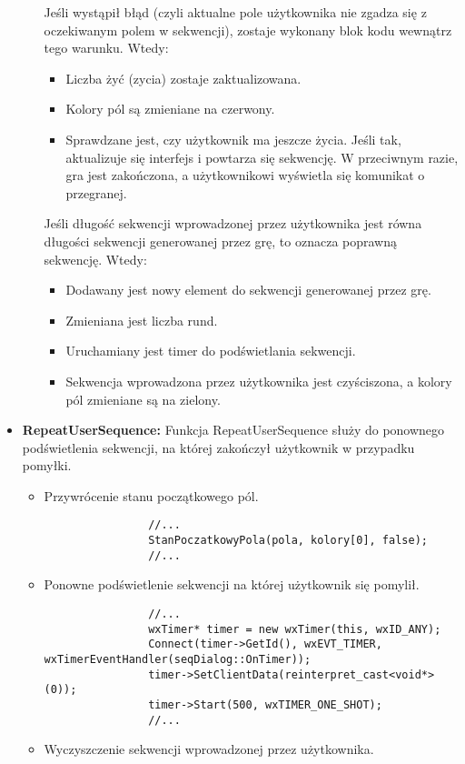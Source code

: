 \documentclass[]{report}
\begin{document}
\begin{itemize}
\begin{itemize}
			Jeśli wystąpił błąd (czyli aktualne pole użytkownika nie zgadza się z oczekiwanym polem w sekwencji), zostaje wykonany blok kodu wewnątrz tego warunku. Wtedy:
			\begin{itemize}
				\item Liczba żyć (zycia) zostaje zaktualizowana.
				\item Kolory pól są zmieniane na czerwony.
				\item Sprawdzane jest, czy użytkownik ma jeszcze życia. Jeśli tak, aktualizuje się interfejs i powtarza się sekwencję. W przeciwnym razie, gra jest zakończona, a użytkownikowi wyświetla się komunikat o przegranej.
			\end{itemize}
			Jeśli długość sekwencji wprowadzonej przez użytkownika jest równa długości sekwencji generowanej przez grę, to oznacza poprawną sekwencję. Wtedy:
			\begin{itemize}
				\item Dodawany jest nowy element do sekwencji generowanej przez grę.
				\item Zmieniana jest liczba rund.
				\item Uruchamiany jest timer do podświetlania sekwencji.
				\item Sekwencja wprowadzona przez użytkownika jest czyściszona, a kolory pól zmieniane są na zielony.
			\end{itemize}
		\end{itemize}
		\item \textbf{RepeatUserSequence:} Funkcja RepeatUserSequence służy do ponownego podświetlenia sekwencji, na której zakończył użytkownik w przypadku pomyłki.
		\begin{itemize}
			\item Przywrócenie stanu początkowego pól.
			\begin{lstlisting}
				//...
				StanPoczatkowyPola(pola, kolory[0], false);
				//...
			\end{lstlisting}
			\item Ponowne podświetlenie sekwencji na której użytkownik się pomylił.
			\begin{lstlisting}
				//...
				wxTimer* timer = new wxTimer(this, wxID_ANY);
				Connect(timer->GetId(), wxEVT_TIMER, wxTimerEventHandler(seqDialog::OnTimer));
				timer->SetClientData(reinterpret_cast<void*>(0)); 
				timer->Start(500, wxTIMER_ONE_SHOT);
				//...
			\end{lstlisting}
			\item Wyczyszczenie sekwencji wprowadzonej przez użytkownika.

\end{itemize}
\end{itemize}
\end{document}
